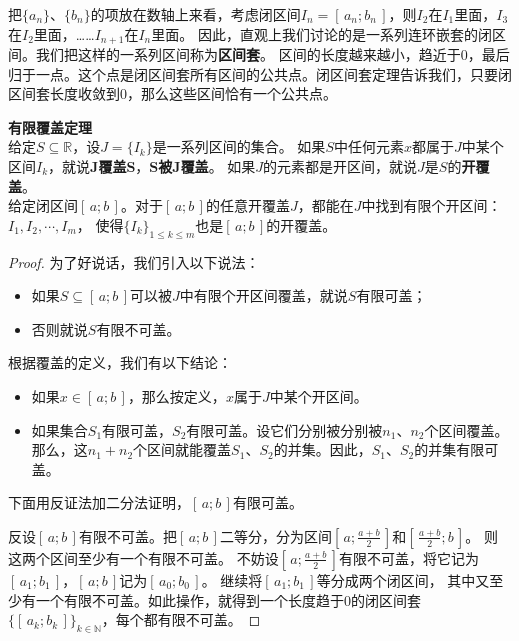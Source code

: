 \documentclass[12pt,UTF8,fontset=none]{ctexbook}
\begin{document}
\begin{appendix}
把$\{a_n\}$、$\{b_n\}$的项放在数轴上来看，考虑闭区间$I_n = [\,a_{n}; b_{n}\,]$，则$I_{2}$在$I_1$里面，$I_{3}$在$I_2$里面，……$I_{n+1}$在$I_n$里面。
因此，直观上我们讨论的是一系列连环嵌套的闭区间。我们把这样的一系列区间称为\textbf{区间套}。
区间的长度越来越小，趋近于$0$，最后归于一点。这个点是闭区间套所有区间的公共点。闭区间套定理告诉我们，只要闭区间套长度收敛到$0$，那么这些区间恰有一个公共点。

\begin{tm}\textbf{有限覆盖定理}\label{tm:a-2-50}\\
    给定$S\subseteq\mathbb{R}$，设$J = \{I_k\}$是一系列区间的集合。
    如果$S$中任何元素$x$都属于$J$中某个区间$I_k$，就说$\boldsymbol{J}$\textbf{覆盖}$\boldsymbol{S}$，$\boldsymbol{S}$\textbf{被}$\boldsymbol{J}$\textbf{覆盖}。
    如果$J$的元素都是开区间，就说$J$是$S$的\textbf{开覆盖}。\\    
    给定闭区间$[\,a; b\,]$。对于$[\,a; b\,]$的任意开覆盖$J$，都能在$J$中找到有限个开区间：$I_1, I_2, \cdots, I_m$，
    使得$\{I_k\}_{1\leqslant k\leqslant m}$也是$[\,a; b\,]$的开覆盖。
\end{tm}
\begin{proof}
    为了好说话，我们引入以下说法：
    \begin{itemize}
        \item 如果$S\subseteq[\,a; b\,]$可以被$J$中有限个开区间覆盖，就说$S$有限可盖；
        \item 否则就说$S$有限不可盖。
    \end{itemize}
    根据覆盖的定义，我们有以下结论：
    \begin{itemize}
        \item 如果$x\in[\,a; b\,]$，那么按定义，$x$属于$J$中某个开区间。
        \item 如果集合$S_1$有限可盖，$S_2$有限可盖。设它们分别被分别被$n_1$、$n_2$个区间覆盖。那么，这$n_1 + n_2$个区间就能覆盖$S_1$、$S_2$的并集。因此，$S_1$、$S_2$的并集有限可盖。
    \end{itemize}

    下面用反证法加二分法证明，$[\,a; b\,]$有限可盖。

    反设$[\,a; b\,]$有限不可盖。把$[\,a; b\,]$二等分，分为区间$\left[\,a; \frac{a+b}{2}\,\right]$和$\left[\,\frac{a+b}{2}; b\,\right]$。
    则这两个区间至少有一个有限不可盖。
    不妨设$\left[\,a; \frac{a+b}{2}\,\right]$有限不可盖，将它记为$[\,a_1; b_1\,]$，$[\,a; b\,]$记为$[\,a_0; b_0\,]$。
    继续将$[\,a_1; b_1\,]$等分成两个闭区间，
    其中又至少有一个有限不可盖。如此操作，就得到一个长度趋于$0$的闭区间套$\{[\,a_k; b_k\,]\}_{k\in\mathbb{N}}$，每个都有限不可盖。


\end{proof}
\end{appendix}
\end{document}
